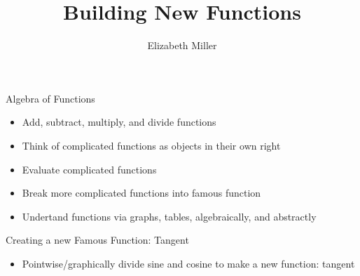 \documentclass{ximera}
\author{Elizabeth Miller}
\title{Building New Functions}
\begin{document}
\begin{abstract}
\end{abstract}
\maketitle


\begin{objectives}

\item Algebra of Functions
\begin{itemize}
	\item Add, subtract, multiply, and divide functions 
	\item Think of complicated functions as objects in their own right 
	\item Evaluate complicated functions 
	\item Break more complicated functions into famous function %
	\item Undertand functions via graphs, tables, algebraically, and abstractly 
\end{itemize}


\item Creating a new Famous Function: Tangent
\begin{itemize}
	\item Pointwise/graphically divide sine and cosine to make a new function: tangent
\end{itemize}

\end{objectives}
\end{document}
